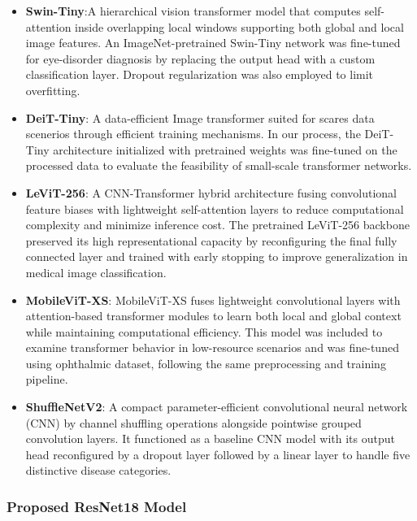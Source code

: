 \documentclass[conference,9pt]{IEEEtran}
\begin{document}
\begin{itemize}
    \item \textbf{Swin-Tiny}:A hierarchical vision transformer model that computes self-attention inside overlapping local windows supporting both global and local image features. An ImageNet-pretrained Swin-Tiny network was fine-tuned for eye-disorder diagnosis by replacing the output head with a custom classification layer. Dropout regularization was also employed to limit overfitting.

    \item \textbf{DeiT-Tiny}: A data-efficient Image transformer suited for scares data scenerios through efficient training mechanisms. In our process, the DeiT-Tiny architecture initialized with pretrained weights was fine-tuned on the processed data to evaluate the feasibility of small-scale transformer networks.

    \item \textbf{LeViT-256}: A CNN-Transformer hybrid architecture fusing convolutional feature biases with lightweight self-attention layers to reduce computational complexity and minimize inference cost. The pretrained LeViT-256 backbone preserved its high representational capacity by reconfiguring the final fully connected layer and trained with early stopping to improve generalization in medical image classification.

    \item \textbf{MobileViT-XS}: MobileViT-XS fuses lightweight convolutional layers with attention-based transformer modules to learn both local and global context while maintaining computational efficiency. This model was included to examine transformer behavior in low-resource scenarios and was fine-tuned using ophthalmic dataset, following the same preprocessing and training pipeline. 

    \item \textbf{ShuffleNetV2}: A compact parameter-efficient convolutional neural network (CNN) by channel shuffling operations alongside pointwise grouped convolution layers. It functioned as a baseline CNN model with its output head reconfigured by a dropout layer followed by a linear layer to handle five distinctive disease categories.
\end{itemize}

\subsubsection{\textbf{Proposed ResNet18 Model}}
\end{document}
